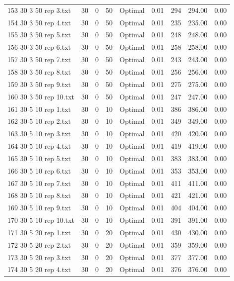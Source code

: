 \begin{longtable}{lrrllrrrr}
153 30 3 50 rep 3.txt & 30 & 0 & 50 & Optimal &  0.01 & 294 & 294.00 &  0.00\\
154 30 3 50 rep 4.txt & 30 & 0 & 50 & Optimal &  0.01 & 235 & 235.00 &  0.00\\
155 30 3 50 rep 5.txt & 30 & 0 & 50 & Optimal &  0.01 & 248 & 248.00 &  0.00\\
156 30 3 50 rep 6.txt & 30 & 0 & 50 & Optimal &  0.01 & 258 & 258.00 &  0.00\\
157 30 3 50 rep 7.txt & 30 & 0 & 50 & Optimal &  0.01 & 243 & 243.00 &  0.00\\
158 30 3 50 rep 8.txt & 30 & 0 & 50 & Optimal &  0.01 & 256 & 256.00 &  0.00\\
159 30 3 50 rep 9.txt & 30 & 0 & 50 & Optimal &  0.01 & 275 & 275.00 &  0.00\\
160 30 3 50 rep 10.txt & 30 & 0 & 50 & Optimal &  0.01 & 247 & 247.00 &  0.00\\
161 30 5 10 rep 1.txt & 30 & 0 & 10 & Optimal &  0.01 & 386 & 386.00 &  0.00\\
162 30 5 10 rep 2.txt & 30 & 0 & 10 & Optimal &  0.01 & 349 & 349.00 &  0.00\\
163 30 5 10 rep 3.txt & 30 & 0 & 10 & Optimal &  0.01 & 420 & 420.00 &  0.00\\
164 30 5 10 rep 4.txt & 30 & 0 & 10 & Optimal &  0.01 & 419 & 419.00 &  0.00\\
165 30 5 10 rep 5.txt & 30 & 0 & 10 & Optimal &  0.01 & 383 & 383.00 &  0.00\\
166 30 5 10 rep 6.txt & 30 & 0 & 10 & Optimal &  0.01 & 353 & 353.00 &  0.00\\
167 30 5 10 rep 7.txt & 30 & 0 & 10 & Optimal &  0.01 & 411 & 411.00 &  0.00\\
168 30 5 10 rep 8.txt & 30 & 0 & 10 & Optimal &  0.01 & 421 & 421.00 &  0.00\\
169 30 5 10 rep 9.txt & 30 & 0 & 10 & Optimal &  0.01 & 404 & 404.00 &  0.00\\
170 30 5 10 rep 10.txt & 30 & 0 & 10 & Optimal &  0.01 & 391 & 391.00 &  0.00\\
171 30 5 20 rep 1.txt & 30 & 0 & 20 & Optimal &  0.01 & 430 & 430.00 &  0.00\\
172 30 5 20 rep 2.txt & 30 & 0 & 20 & Optimal &  0.01 & 359 & 359.00 &  0.00\\
173 30 5 20 rep 3.txt & 30 & 0 & 20 & Optimal &  0.01 & 377 & 377.00 &  0.00\\
174 30 5 20 rep 4.txt & 30 & 0 & 20 & Optimal &  0.01 & 376 & 376.00 &  0.00\\

\end{longtable}
